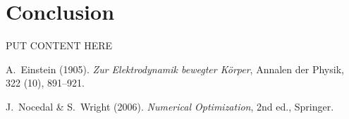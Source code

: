 \documentclass[12pt]{amsart}
\begin{document}
\section{Conclusion}  PUT CONTENT HERE

\begin{thebibliography}{2}  %
A.~Einstein (1905). 
\textit{Zur Elektrodynamik bewegter K{\"o}rper},
Annalen der Physik, 322 (10), 891--921.

J.~Nocedal \& S.~Wright (2006).
\textit{Numerical Optimization},
2nd ed., Springer.
\end{thebibliography}
\end{document}

